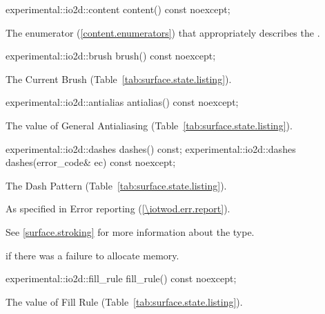 \begin{itemdecl}
experimental::io2d::content content() const noexcept;
\end{itemdecl}
\begin{itemdescr}
\pnum
\returns
The  enumerator (\ref{content.enumerators}) that appropriately describes the \underlyingsurface.
\end{itemdescr}

\begin{itemdecl}
experimental::io2d::brush brush() const noexcept;
\end{itemdecl}
\begin{itemdescr}
\pnum
\returns
The Current Brush (Table~\ref{tab:surface.state.listing}).
\end{itemdescr}

\begin{itemdecl}
experimental::io2d::antialias antialias() const noexcept;
\end{itemdecl}
\begin{itemdescr}
\pnum
\returns
The value of General Antialiasing (Table~\ref{tab:surface.state.listing}).
\end{itemdescr}

\begin{itemdecl}
experimental::io2d::dashes dashes() const;
experimental::io2d::dashes dashes(error_code& ec) const noexcept;
\end{itemdecl}
\begin{itemdescr}
\pnum
\returns
The Dash Pattern (Table~\ref{tab:surface.state.listing}).

\pnum
\throws
As specified in Error reporting (\ref{\iotwod.err.report}).

\pnum
\remarks
See \ref{surface.stroking} for more information about the  type.

\pnum
\errors
{} if there was a failure to allocate memory.
\end{itemdescr}

\begin{itemdecl}
experimental::io2d::fill_rule fill_rule() const noexcept;
\end{itemdecl}
\begin{itemdescr}
\pnum
\returns
The value of Fill Rule (Table~\ref{tab:surface.state.listing}).
\end{itemdescr}

